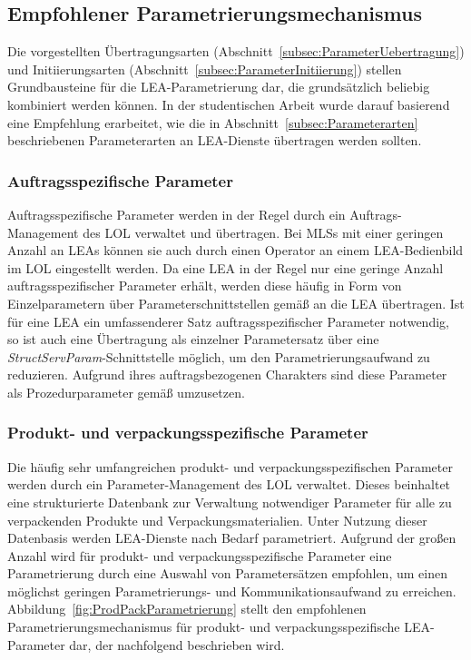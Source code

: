 \subsection{Empfohlener Parametrierungsmechanismus}
\label{subsec:Parametrierngsmech}

Die vorgestellten Übertragungsarten (Abschnitt~\ref{subsec:ParameterUebertragung}) und Initiierungsarten (Abschnitt~\ref{subsec:ParameterInitiierung}) stellen Grundbausteine für die LEA-Parametrierung dar, die grund\-sätz\-lich beliebig kombiniert werden können. In der studentischen Arbeit \cite{Janzen.2023} wurde darauf basierend eine Empfehlung erarbeitet, wie die in Abschnitt~\ref{subsec:Parameterarten} beschriebenen Parameterarten an LEA-Dienste übertragen werden sollten.

\subsubsection{Auftragsspezifische Parameter}

Auftragsspezifische Parameter werden in der Regel durch ein Auftrags-Management des LOL verwaltet und übertragen. Bei MLSs mit einer geringen Anzahl an LEAs können sie auch durch einen Operator an einem LEA-Bedienbild im LOL eingestellt werden. Da eine LEA in der Regel nur eine geringe Anzahl auftragsspezifischer Parameter erhält, werden diese häufig in Form von Einzelparametern über Parameterschnittstellen gemäß \cite{PNO.2025.Part4} an die LEA übertragen. Ist für eine LEA ein umfassenderer Satz auftragsspezifischer Parameter notwendig, so ist auch eine Übertragung als einzelner Parametersatz über eine \emph{StructServParam}-Schnittstelle möglich, um den Parametrierungsaufwand zu reduzieren. Aufgrund ihres auftragsbezogenen Charakters sind diese Parameter als Prozedurparameter gemäß \cite{PNO.2025.Part4} umzusetzen.

\subsubsection{Produkt- und verpackungsspezifische Parameter}

Die häufig sehr umfangreichen produkt- und verpackungsspezifischen Parameter werden durch ein Parameter-Management des LOL verwaltet. Dieses beinhaltet eine strukturierte Datenbank zur Verwaltung notwendiger Parameter für alle zu verpackenden Produkte und Verpackungsmaterialien. Unter Nutzung dieser Datenbasis werden LEA-Dienste nach Bedarf parametriert. Aufgrund der großen Anzahl wird für produkt- und verpackungsspezifische Parameter eine Parametrierung durch eine Auswahl von Parametersätzen empfohlen, um einen möglichst geringen Parametrierungs- und Kommunikationsaufwand zu erreichen. Abbildung~\ref{fig:ProdPackParametrierung} stellt den empfohlenen Parametrierungsmechanismus für produkt- und verpackungsspezifische LEA-Parameter dar, der nachfolgend beschrieben wird.


